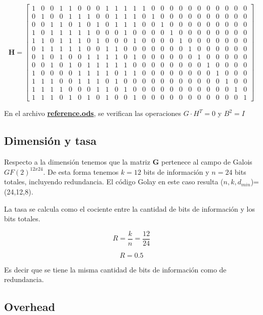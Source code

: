 \[
\mathbf{H} =
\left[
\begin{array}{cccccccccccc|cccccccccccc}
1&0&0&1&1&0&0&0&1&1&1&1&
1&0&0&0&0&0&0&0&0&0&0&0\\
0&1&0&0&1&1&1&0&0&1&1&1&
0&1&0&0&0&0&0&0&0&0&0&0\\
0&0&1&1&0&1&0&1&0&1&1&1&
0&0&1&0&0&0&0&0&0&0&0&0\\
1&0&1&1&1&1&1&0&0&0&1&0&
0&0&0&1&0&0&0&0&0&0&0&0\\
1&1&0&1&1&1&0&1&0&0&0&1&
0&0&0&0&1&0&0&0&0&0&0&0\\
0&1&1&1&1&1&0&0&1&1&0&0&
0&0&0&0&0&1&0&0&0&0&0&0\\
0&1&0&1&0&0&1&1&1&1&0&1&
0&0&0&0&0&0&1&0&0&0&0&0\\
0&0&1&0&1&0&1&1&1&1&1&0&
0&0&0&0&0&0&0&1&0&0&0&0\\
1&0&0&0&0&1&1&1&1&0&1&1&
0&0&0&0&0&0&0&0&1&0&0&0\\
1&1&1&0&0&1&1&1&0&1&0&0&
0&0&0&0&0&0&0&0&0&1&0&0\\
1&1&1&1&0&0&0&1&1&0&1&0&
0&0&0&0&0&0&0&0&0&0&1&0\\
1&1&1&0&1&0&1&0&1&0&0&1&
0&0&0&0&0&0&0&0&0&0&0&1
\end{array}
\right]
\]

En el archivo \href{https://github.com/AbelCorvalan0/fec-lab2/tree/main/reference-calc}{\textbf{reference.ods}}, se verifican las operaciones $G \cdot H^{T} = 0$ y $B^{2}=I$

\subsection{Dimensión y tasa}

Respecto a la dimensión tenemos que la matriz \textbf{G} pertenece al campo de Galois $GF(2)^{12x24}$. De esta forma tenemos $ k = 12 $ bits de información y $ n = 24 $ bits totales, incluyendo redundancia.
El código Golay en este caso resulta ($n, k, d_{min}$)=(24,12,8).

La tasa se calcula como el cociente entre la cantidad de bits de información y los bits totales.

$$ R= \frac{k}{n} = \frac{12}{24} $$

$$ \boxed{R= 0.5} $$

Es decir que se tiene la misma cantidad de bits de información como de redundancia.

\subsection{Overhead}

